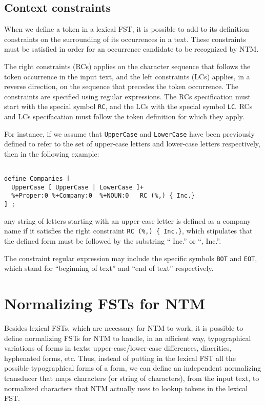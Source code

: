 \documentclass{article}
\newcommand{\scode}[1]{{\tt #1}}
\begin{document}
\subsection{Context constraints}
\label{constraints}

When we define a token in a lexical FST, it is possible to add to its definition constraints on the surrounding of its occurrences in a text. These constraints must be satisfied in order for an occurrence candidate to be recognized by NTM.

The right constraints (RCs) applies on the character sequence that follows the token occurrence in the input text, and the left constraints (LCs) applies, in a reverse direction, on the sequence that precedes the token occurrence. The constraints are specified using regular expressions. The RCs specification must start with the special symbol \scode{RC}, and the LCs with the special symbol \scode{LC}. RCs and LCs specifacation must follow the token definition for which they apply.

For instance, if we assume that \scode{UpperCase} and \scode{LowerCase} have been previously defined to refer to the set of upper-case letters and lower-case letters respectively, then in the following example:


\begin{verbatim}

define Companies [
  UpperCase [ UpperCase | LowerCase ]+
  %+Proper:0 %+Company:0  %+NOUN:0   RC (%,) { Inc.}
] ;

\end{verbatim}

any string of letters starting with an upper-case letter is defined as a company name if it satisfies the right constraint \scode{RC (\%,) \{ Inc.\}}, which stipulates that the defined form must be followed by the substring `` Inc.'' or ``, Inc.''.

The constraint regular expression may include the specific symbols \scode{BOT} and \scode{EOT}, which stand for ``beginning of text'' and ``end of text'' respectively.


\section{Normalizing FSTs for NTM}
\label{normalizingFSTs}

Besides lexical FSTs, which are necessary for NTM to work, it is possible to define normalizing FSTs for NTM to handle, in an afficient way, typographical variations of forms in texts: upper-case/lower-case differences, diacritics, hyphenated forms, etc. Thus, instead of putting in the lexical FST all the possible typographical forms of a form, we can define an independent normalizing transducer that maps characters (or string of characters), from the input text, to normalized characters that NTM actually uses to lookup tokens in the lexical FST.
\end{document}
